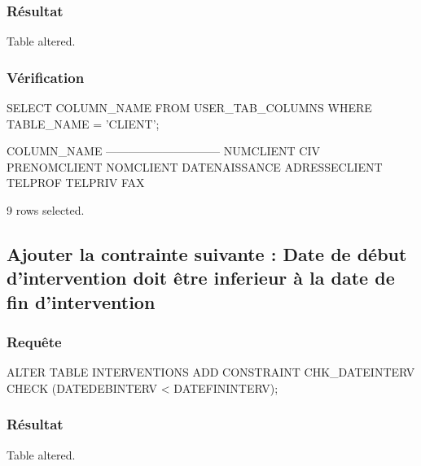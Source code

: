 \documentclass[•]{article}
\begin{document}
\subsubsection{Résultat}
\begin{sql}
Table altered.
\end{sql}
\subsubsection{Vérification}
\begin{sql}
SELECT COLUMN_NAME FROM USER_TAB_COLUMNS WHERE TABLE_NAME = 'CLIENT';

COLUMN_NAME                                                                     
------------------------------                                                  
NUMCLIENT                                                                       
CIV                                                                             
PRENOMCLIENT                                                                    
NOMCLIENT                                                                       
DATENAISSANCE                                                                   
ADRESSECLIENT                                                                   
TELPROF                                                                         
TELPRIV                                                                         
FAX                                                                             

9 rows selected.
\end{sql}
\subsection{Ajouter la contrainte suivante : Date de début d’intervention doit être inferieur à la date de fin d’intervention}
\subsubsection{Requête}
\begin{sql}
ALTER TABLE INTERVENTIONS ADD CONSTRAINT CHK_DATEINTERV CHECK (DATEDEBINTERV < DATEFININTERV);
\end{sql}
\subsubsection{Résultat}
\begin{sql}
Table altered.
\end{sql}
\end{document}
